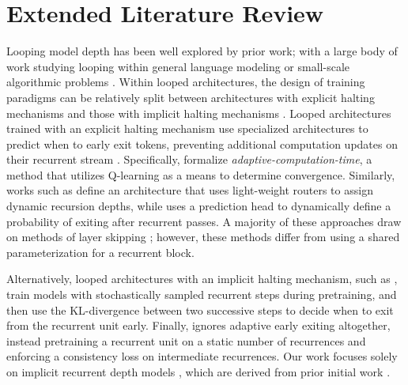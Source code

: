 \newpage
\section{Extended Literature Review}
\label{sec:lit-review}

Looping model depth has been well explored by prior work; with a large body of work studying looping within general language modeling \citep{dehghaniUniversalTransformers2019, zhuScalingLatentReasoning2025, geiping_scaling_2025, mcleish_retrofitted_recurrence, baeMixtureofRecursionsLearningDynamic2025} or small-scale algorithmic problems \citep{avi_learn_algorithm, yangLoopedTransformersAre2023, bansalEndtoendAlgorithmSynthesis2022, wangHierarchicalReasoningModel2025b, jolicoeur-martineauLessMoreRecursive2025}. Within looped architectures, the design of training paradigms can be relatively split between architectures with explicit halting mechanisms \citep{dehghaniUniversalTransformers2019, zhuScalingLatentReasoning2025, baeMixtureofRecursionsLearningDynamic2025, jolicoeur-martineauLessMoreRecursive2025, wangHierarchicalReasoningModel2025b} and those with implicit halting mechanisms \citep{geiping_scaling_2025, mcleish_retrofitted_recurrence, LoopFormerElasticDepthLooped2025, xuExpressivePowerLooped2025}. 
Looped architectures trained with an explicit halting mechanism use specialized architectures to predict when to early exit tokens, preventing additional computation updates on their recurrent stream \citep{wangHierarchicalReasoningModel2025b, jolicoeur-martineauLessMoreRecursive2025, baeMixtureofRecursionsLearningDynamic2025, dehghaniUniversalTransformers2019, elbayadDepthAdaptiveTransformer2020}. Specifically, \citet{wangHierarchicalReasoningModel2025b, jolicoeur-martineauLessMoreRecursive2025} formalize \emph{adaptive-computation-time}, a method that utilizes Q-learning as a means to determine convergence. Similarly, works such as \citet{baeMixtureofRecursionsLearningDynamic2025} define an architecture that uses light-weight routers to assign dynamic recursion depths, while \citet{zhuScalingLatentReasoning2025} uses a prediction head to dynamically define a probability of exiting after recurrent passes. A majority of these approaches draw on methods of layer skipping \citep{elhoushiLayerSkipEnablingEarly2024, raposoMixtureofDepthsDynamicallyAllocating2024}; however, these methods differ from using a shared parameterization for a recurrent block.

Alternatively, looped architectures with an implicit halting mechanism, such as \citet{geiping_scaling_2025, mcleish_retrofitted_recurrence,avi_learn_algorithm,bansalEndtoendAlgorithmSynthesis2022}, train models with stochastically sampled recurrent steps during pretraining, and then use the KL-divergence between two successive steps to decide when to exit from the recurrent unit early. Finally, \citet{LoopFormerElasticDepthLooped2025} ignores adaptive early exiting altogether, instead pretraining a recurrent unit on a static number of recurrences and enforcing a consistency loss on intermediate recurrences.
Our work focuses solely on implicit recurrent depth models \citep{geiping_scaling_2025, mcleish_retrofitted_recurrence}, which are derived from prior initial work \citep{avi_learn_algorithm, bansalEndtoendAlgorithmSynthesis2022}.

